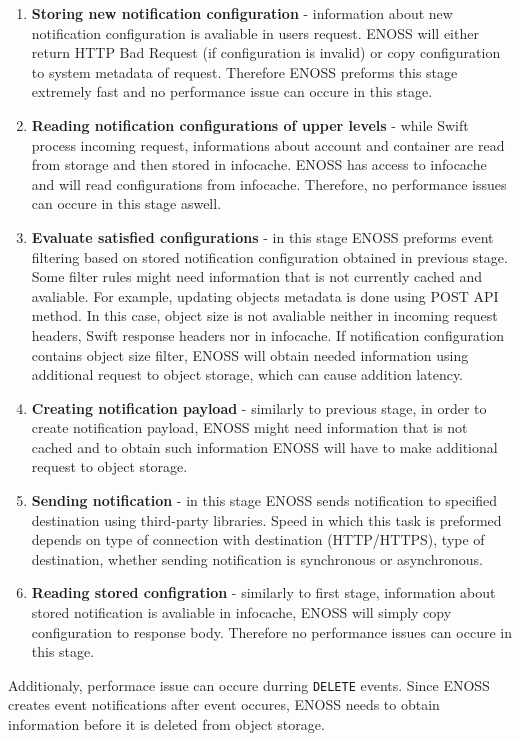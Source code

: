     \begin{enumerate}
        \item \textbf{Storing new notification configuration} - information about new notification configuration is avaliable in users request. ENOSS will either return HTTP Bad Request (if configuration is invalid) or copy configuration to system metadata of request. Therefore ENOSS preforms this stage extremely fast and no performance issue can occure in this stage.
        \item \textbf{Reading notification configurations of upper levels} - while Swift process incoming request, informations about account and container are read from storage and then stored in infocache. ENOSS has access to infocache and will read configurations from infocache. Therefore, no performance issues can occure in this stage aswell.
        \item \textbf{Evaluate satisfied configurations} - in this stage ENOSS preforms event filtering based on stored notification configuration obtained in previous stage. Some filter rules might need information that is not currently cached and avaliable. For example, updating objects metadata is done using POST API method. In this case, object size is not avaliable neither in incoming request headers, Swift response headers nor in infocache. If notification configuration contains object size filter, ENOSS will obtain needed information using additional request to object storage, which can cause addition latency.
        \item \textbf{Creating notification payload} - similarly to previous stage, in order to create notification payload, ENOSS might need information that is not cached and to obtain such information ENOSS will have to make additional request to object storage.
        \item \textbf{Sending notification} - in this stage ENOSS sends notification to specified destination using third-party libraries. Speed in which this task is preformed depends on type of connection with destination (HTTP/HTTPS), type of destination, whether sending notification is synchronous or asynchronous.
        \item \textbf{Reading stored configration} - similarly to first stage, information about stored notification is avaliable in infocache, ENOSS will simply copy configuration to response body. Therefore no performance issues can occure in this stage.
    \end{enumerate}

    Additionaly, performace issue can occure durring \texttt{DELETE} events. Since ENOSS creates event notifications after event occures, ENOSS needs to obtain information before it is deleted from object storage.

